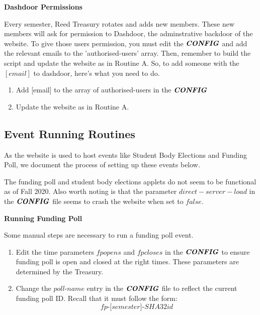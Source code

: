 \documentclass[a4paper]{article}
\begin{document}
\begin{center}
\textbf{Dashdoor Permissions}
\end{center}

Every semester, Reed Treasury rotates and adds new members. These new members will ask for permission to Dashdoor, the adminstrative backdoor of the website. To give those users permission, you must edit the $\textbf{\textit{CONFIG}}$ and add the relevant emails to the 'authorised-users' array. Then, remember to build the script and update the website as in Routine A. So, to add someone with the $[email]$ to dashdoor, here's what you need to do.

\begin{enumerate}
  \item Add [email] to the array of authorised-users in the $\textbf{\textit{CONFIG}}$
  \item Update the website as in Routine A.
\end{enumerate}

\subsection{Event Running Routines}

As the website is used to host events like Student Body Elections and Funding Poll, we document the process of setting up these events below.

\begin{warning*}
The funding poll and student body elections applets do not seem to be functional as of Fall 2020. Also worth noting is that the parameter $direct-server-load$ in the $\textbf{\textit{CONFIG}}$ file seems to crash the website when set to $false$.
\end{warning*}

\begin{center}
\textbf{Running Funding Poll}
\end{center}

Some manual steps are necessary to run a funding poll event.

\begin{enumerate}
  \item Edit the time parameters $\textit{fpopens}$ and $\textit{fpcloses}$ in the $\textbf{\textit{CONFIG}}$ to ensure funding poll is open and closed at the right times. These parameters are determined by the Treasury.

  \item Change the $\textit{poll-name}$ entry in the $\textbf{\textit{CONFIG}}$ file to reflect the current funding poll ID. Recall that it must follow the form:
  $$\textit{fp-[semester]-SHA32id}$$
\end{enumerate}
\end{document}
